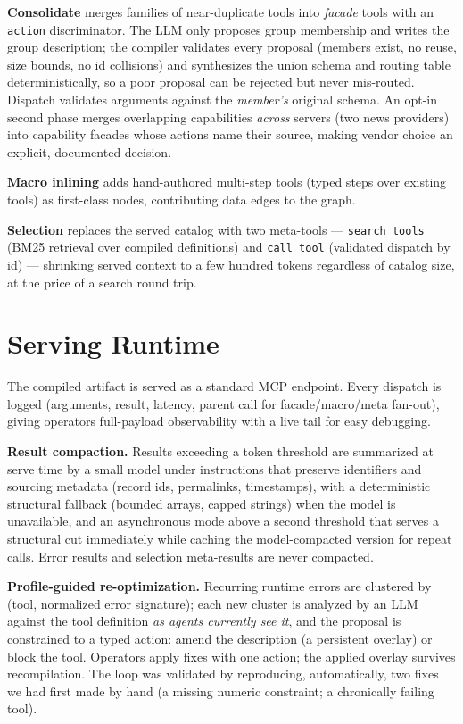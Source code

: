 \documentclass[11pt]{article}
\begin{document}
\textbf{Consolidate} merges families of near-duplicate tools into
\emph{facade} tools with an \texttt{action} discriminator. The LLM only
proposes group membership and writes the group description; the compiler
validates every proposal (members exist, no reuse, size bounds, no id
collisions) and synthesizes the union schema and routing table
deterministically, so a poor proposal can be rejected but never mis-routed.
Dispatch validates arguments against the \emph{member's} original schema. An
opt-in second phase merges overlapping capabilities \emph{across} servers
(two news providers) into capability facades whose actions name their source,
making vendor choice an explicit, documented decision.

\textbf{Macro inlining} adds hand-authored multi-step tools (typed steps over
existing tools) as first-class nodes, contributing data edges to the graph.

\textbf{Selection} replaces the served catalog with two meta-tools ---
\texttt{search\_tools} (BM25 retrieval over compiled definitions) and
\texttt{call\_tool} (validated dispatch by id) --- shrinking served context
to a few hundred tokens regardless of catalog size, at the price of a search
round trip.

\section{Serving Runtime}\label{sec:runtime}

The compiled artifact is served as a standard MCP endpoint. Every dispatch is
logged (arguments, result, latency, parent call for facade/macro/meta
fan-out), giving operators full-payload observability with a live tail for easy debugging.

\textbf{Result compaction.} Results exceeding a token threshold are
summarized at serve time by a small model under instructions that preserve
identifiers and sourcing metadata (record ids, permalinks, timestamps), with
a deterministic structural fallback (bounded arrays, capped strings) when the
model is unavailable, and an asynchronous mode above a second threshold that
serves a structural cut immediately while caching the model-compacted version
for repeat calls. Error results and selection meta-results are never
compacted.

\textbf{Profile-guided re-optimization.} Recurring runtime errors are
clustered by (tool, normalized error signature); each new cluster is analyzed
by an LLM against the tool definition \emph{as agents currently see it}, and
the proposal is constrained to a typed action: amend the description (a
persistent overlay) or block the tool. Operators apply fixes with one action;
the applied overlay survives recompilation. The loop was validated by
reproducing, automatically, two fixes we had first made by hand (a missing
numeric constraint; a chronically failing tool).
\end{document}

